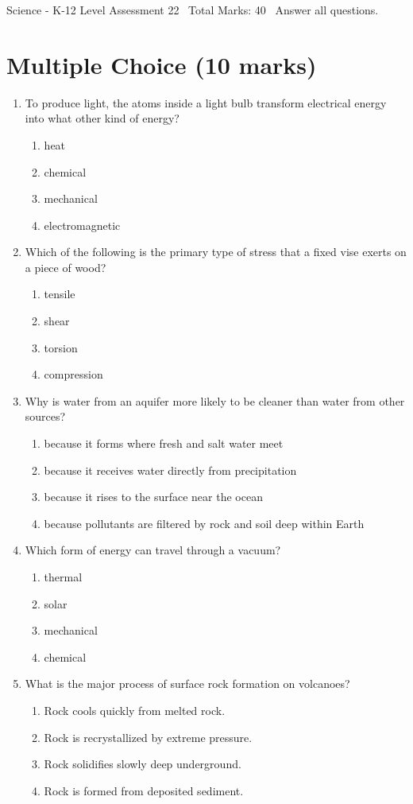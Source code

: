 \documentclass[12pt]{article}
\begin{document}
\begin{center}
Science - K-12 Level Assessment 22 \
Total Marks: 40 \
Answer all questions.
\end{center}

\section*{Multiple Choice (10 marks)}
\begin{enumerate}[label=\arabic*.]
\item To produce light, the atoms inside a light bulb transform electrical energy into what other kind of energy?
\begin{enumerate}[label=(\alph*)]
    \item heat
    \item chemical
    \item mechanical
    \item electromagnetic
\end{enumerate}
\item Which of the following is the primary type of stress that a fixed vise exerts on a piece of wood?
\begin{enumerate}[label=(\alph*)]
    \item tensile
    \item shear
    \item torsion
    \item compression
\end{enumerate}
\item Why is water from an aquifer more likely to be cleaner than water from other sources?
\begin{enumerate}[label=(\alph*)]
    \item because it forms where fresh and salt water meet
    \item because it receives water directly from precipitation
    \item because it rises to the surface near the ocean
    \item because pollutants are filtered by rock and soil deep within Earth
\end{enumerate}
\item Which form of energy can travel through a vacuum?
\begin{enumerate}[label=(\alph*)]
    \item thermal
    \item solar
    \item mechanical
    \item chemical
\end{enumerate}
\item What is the major process of surface rock formation on volcanoes?
\begin{enumerate}[label=(\alph*)]
    \item Rock cools quickly from melted rock.
    \item Rock is recrystallized by extreme pressure.
    \item Rock solidifies slowly deep underground.
    \item Rock is formed from deposited sediment.
\end{enumerate}
\end{enumerate}
\end{document}
